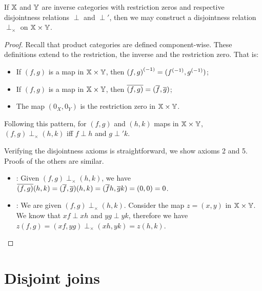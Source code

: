 \begin{lemma}\label{lem:disjointness_is_derivable_on_a_product_category}
  If $\mathbb{X}$ and $\mathbb{Y}$ are inverse categories with restriction zeros and respective disjointness
  relations $\perp$ and $\perp'$, then we may construct a disjointness relation
  $\perp_{\times}$ on $\mathbb{X}\times\mathbb{Y}$.
\end{lemma}
\begin{proof}
  Recall that product categories are defined component-wise. These definitions extend to the
  restriction, the inverse and the restriction zero. That is:
  \begin{itemize}
    \item If $(f,g)$ is a map in $\mathbb{X}\times\mathbb{Y}$, then ${(f,g)}^{(-1)} = ({f}^{(-1)}, {g}^{(-1)})$;
    \item If $(f,g)$ is a map in $\mathbb{X}\times\mathbb{Y}$, then $\overline{(f,g)} = (\overline{f}, \overline{g})$;
    \item The map $(0_X,0_Y)$ is the restriction zero in $\mathbb{X}\times\mathbb{Y}$.
  \end{itemize}

  Following this pattern, for $(f,g)$ and $(h,k)$ maps in $\mathbb{X}\times\mathbb{Y}$, $(f,g) \perp_{\times}(h,k)$
  iff $f\perp h$ and $g\perp' k$.

  Verifying the disjointness axioms is straightforward, we show axioms 2 and 5. Proofs of the
  others are similar.
  {
  \begin{itemize}
    \item [\axiom{Dis}{2}]: Given $(f,g)\perp_{\times}(h,k)$, we have
      $\overline{(f,g)}(h,k) =  (\overline{f},\overline{g})(h,k) = (\overline{f} h, \overline{g} k) = (0, 0) = 0$.
    \item [\axiom{Dis}{5}]: We are given $(f,g)\perp_{\times}(h,k)$. Consider the map $z = (x,y)$
      in $\mathbb{X} \times \mathbb{Y}$. We know that $x f \perp x h$ and $y g \perp y k$, therefore we have
      $z(f,g) = (x f, y g) \perp_{\times} (x h, y k) = z(h,k)$.
  \end{itemize}
  }
\end{proof}

\section{Disjoint joins} %
\label{sec:disjoint_joins}

